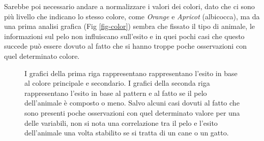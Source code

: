 Sarebbe poi necessario andare a normalizzare i valori dei colori, dato che ci sono più livello che indicano lo stesso colore, come \textit{Orange} e \textit{Apricot} (albicocca), ma da una prima analisi grafica (Fig \ref{fig-color}) sembra che fissato il tipo di animale, le informazioni sul pelo non influiscano sull'esito e in quei pochi casi che questo succede può essere dovuto al fatto che si hanno troppe poche osservazioni con quel determinato colore.

\begin{figure}[!ht]
	\centering
	\quad
	
	\quad
	\caption{I grafici della prima riga rappresentano rappresentano l'esito in base al colore principale e secondario. I grafici della seconda riga rappresentano l'esito in base al pattern e al fatto se il pelo dell'animale è composto o meno. Salvo alcuni casi dovuti al fatto che sono presenti poche osservazioni con quel determinato valore per una delle variabili, non si nota una correlazione tra il pelo e l'esito dell'animale una volta stabilito se si tratta di un cane o un gatto.}
	\label{fig-colors}
\end{figure}

